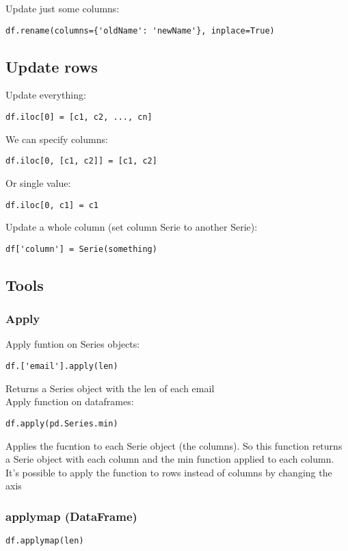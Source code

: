 \documentclass[french]{article}
\begin{document}
Update just some columns:
\begin{verbatim}
df.rename(columns={'oldName': 'newName'}, inplace=True)
\end{verbatim}

\subsection{Update rows}

Update everything:
\begin{verbatim}
df.iloc[0] = [c1, c2, ..., cn]
\end{verbatim}

We can specify columns:
\begin{verbatim}
df.iloc[0, [c1, c2]] = [c1, c2]
\end{verbatim}

Or single value:
\begin{verbatim}
df.iloc[0, c1] = c1
\end{verbatim}

Update a whole column (set column Serie to another Serie):
\begin{verbatim}
df['column'] = Serie(something)
\end{verbatim}

\subsection{Tools}
\subsubsection{Apply}

Apply funtion on Series objects:
\begin{verbatim}
df.['email'].apply(len)
\end{verbatim}
Returns a Series object with the len of each email\\

Apply function on dataframes:
\begin{verbatim}
df.apply(pd.Series.min)
\end{verbatim}
Applies the fucntion to each Serie object (the columns). So this function returns a Serie object with each column and the min function applied to each column.\\

It's possible to apply the function to rows instead of columns by changing the axis

\subsubsection{applymap (DataFrame)}
\begin{verbatim}
df.applymap(len)
\end{verbatim}
\end{document}
